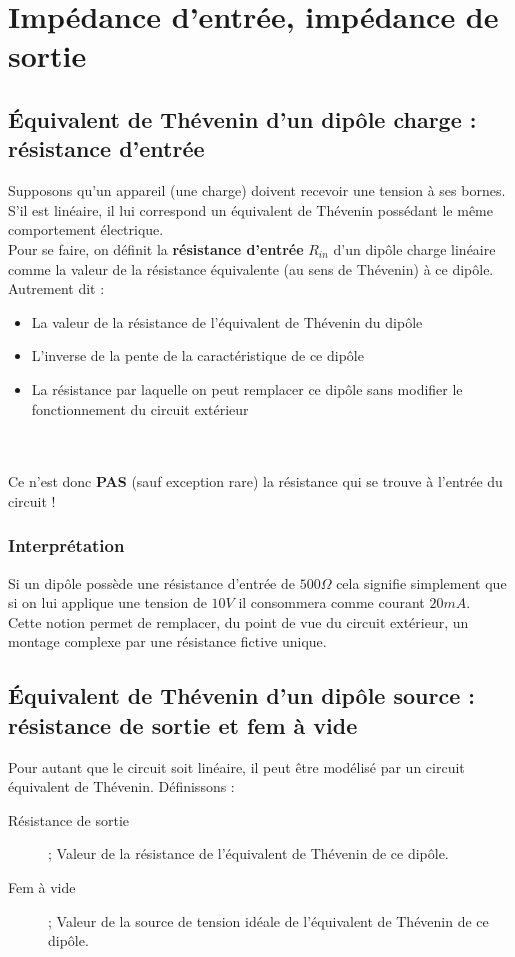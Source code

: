 \documentclass[11pt, a4paper, openany]{book}
\begin{document}
		\section{Impédance d'entrée, impédance de sortie}
		\subsection{Équivalent de Thévenin d'un dipôle charge : résistance d'entrée}
		Supposons qu'un appareil (une charge) doivent recevoir une tension à ses bornes. S'il est linéaire, il lui correspond un équivalent de Thévenin possédant le même comportement électrique.\\
		
		Pour se faire, on définit la \textbf{résistance d'entrée} $R_{in}$ d'un dipôle charge linéaire comme la valeur de la résistance équivalente (au sens de Thévenin) à ce dipôle. Autrement dit :
		\begin{itemize}
			\item La valeur de la résistance de l'équivalent de Thévenin du dipôle
			\item L'inverse de la pente de la caractéristique de ce dipôle
			\item La résistance par laquelle on peut remplacer ce dipôle sans modifier le fonctionnement du circuit extérieur
		\end{itemize}\ \\
		\ \\
		Ce n'est donc \textbf{PAS} (sauf exception rare) la résistance qui se trouve à l'entrée du circuit !
		\subsubsection{Interprétation}
		Si un dipôle possède une résistance d'entrée de $500\Omega$ cela signifie simplement que si on lui applique une tension de $10V$ il consommera comme courant $20 mA$.\\
		
		Cette notion permet de remplacer, du point de vue du circuit extérieur, un montage complexe par une résistance fictive unique.
		
		\subsection{Équivalent de Thévenin d'un dipôle source : résistance de sortie et fem à vide}
		Pour autant que le circuit soit linéaire, il peut être modélisé par un circuit équivalent de Thévenin. Définissons :
		\begin{description}
			\item[Résistance de sortie] ; Valeur de la résistance de l'équivalent de Thévenin de ce dipôle.
			\item[Fem à vide] ; Valeur de la source de tension idéale de l'équivalent de Thévenin de ce dipôle.
		\end{description}
		
\end{document}
